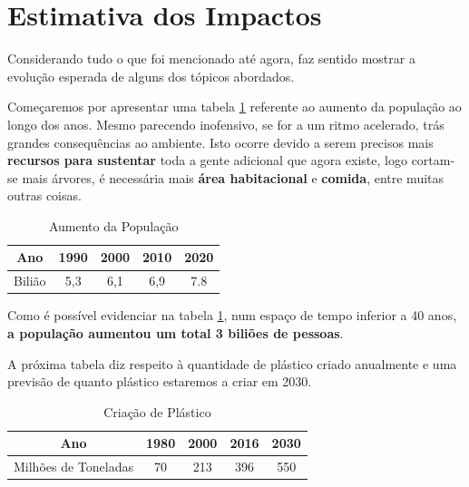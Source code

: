 \documentclass[letterpaper,12pt]{article}
\begin{document}
\newpage
\section{Estimativa dos Impactos}
Considerando tudo o que foi mencionado até agora, faz sentido mostrar a evolução esperada de alguns dos tópicos abordados.\\[0.1cm]
\par \citep{a2020_world}Começaremos por apresentar uma tabela \ref{Tabela 1:população} referente ao aumento da população ao longo dos anos. Mesmo parecendo inofensivo, se for a um ritmo acelerado, trás grandes consequências ao ambiente. Isto ocorre devido a serem precisos mais {\bf recursos para sustentar} toda a gente adicional que agora existe, logo cortam-se mais árvores, é necessária mais {\bf área habitacional} e {\bf comida}, entre muitas outras coisas.
\begin{table}[h!]
\centering
 \begin{tabular}{||c | c c c c||} 
 \hline
 Ano & 1990 & 2000 & 2010 & 2020 \\ [0.5ex] 
 \hline
 Bilião & 5,3 & 6,1 & 6,9 & 7.8 \\ [1.0ex]
 \hline
 \end{tabular}
 \caption{Aumento da População}
 \label{Tabela 1:população}
 \end{table}
\par Como é possível evidenciar na tabela \ref{Tabela 1:população}, num espaço de tempo inferior a 40 anos, {\bf a população  aumentou um total 3 biliões de pessoas}.\\[0.5cm]
\par \citep{vasconcelos_2019_planeta}A próxima tabela diz respeito à quantidade de plástico criado anualmente e uma previsão de quanto plástico estaremos a criar em 2030.
 \begin{table}[H]
\centering
 \begin{tabular}{||c | c c c c||} 
 \hline
 Ano & 1980 & 2000 & 2016 & 2030 \\ [0.5ex] 
 \hline
 Milhões de Toneladas & 70 & 213 & 396 & 550 \\ [1.0ex]
 \hline
 \end{tabular}
 \caption{Criação de Plástico}
 \label{Tabela 2:produção plástico}
 \end{table}
\par \citep{natgeoportugal_2020_sem}
\end{document}
